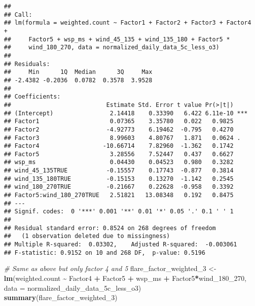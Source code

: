 \documentclass[
]{article}
\newenvironment{Shaded}{\begin{snugshade}}{\end{snugshade}}
\newcommand{\AttributeTok}[1]{\textcolor[rgb]{0.13,0.29,0.53}{#1}}
\newcommand{\CommentTok}[1]{\textcolor[rgb]{0.56,0.35,0.01}{\textit{#1}}}
\newcommand{\FunctionTok}[1]{\textcolor[rgb]{0.13,0.29,0.53}{\textbf{#1}}}
\newcommand{\NormalTok}[1]{#1}
\newcommand{\OtherTok}[1]{\textcolor[rgb]{0.56,0.35,0.01}{#1}}
\newcommand{\SpecialCharTok}[1]{\textcolor[rgb]{0.81,0.36,0.00}{\textbf{#1}}}
\begin{document}
\begin{verbatim}
## 
## Call:
## lm(formula = weighted.count ~ Factor1 + Factor2 + Factor3 + Factor4 + 
##     Factor5 + wsp_ms + wind_45_135 + wind_135_180 + Factor5 * 
##     wind_180_270, data = normalized_daily_data_5c_less_o3)
## 
## Residuals:
##     Min      1Q  Median      3Q     Max 
## -2.4382 -0.2036  0.0782  0.3578  3.9528 
## 
## Coefficients:
##                           Estimate Std. Error t value Pr(>|t|)    
## (Intercept)                2.14418    0.33390   6.422 6.11e-10 ***
## Factor1                    0.07365    3.35780   0.022   0.9825    
## Factor2                   -4.92773    6.19462  -0.795   0.4270    
## Factor3                    8.99603    4.80767   1.871   0.0624 .  
## Factor4                  -10.66714    7.82960  -1.362   0.1742    
## Factor5                    3.28556    7.52447   0.437   0.6627    
## wsp_ms                     0.04430    0.04523   0.980   0.3282    
## wind_45_135TRUE           -0.15557    0.17743  -0.877   0.3814    
## wind_135_180TRUE          -0.15153    0.13270  -1.142   0.2545    
## wind_180_270TRUE          -0.21667    0.22628  -0.958   0.3392    
## Factor5:wind_180_270TRUE   2.51821   13.08348   0.192   0.8475    
## ---
## Signif. codes:  0 '***' 0.001 '**' 0.01 '*' 0.05 '.' 0.1 ' ' 1
## 
## Residual standard error: 0.8524 on 268 degrees of freedom
##   (1 observation deleted due to missingness)
## Multiple R-squared:  0.03302,    Adjusted R-squared:  -0.003061 
## F-statistic: 0.9152 on 10 and 268 DF,  p-value: 0.5196
\end{verbatim}

\begin{Shaded}
\begin{Highlighting}[]
\CommentTok{\# Same as above but only factor 4 and 5}
\NormalTok{flare\_factor\_weighted\_3 }\OtherTok{\textless{}{-}} \FunctionTok{lm}\NormalTok{(weighted.count }\SpecialCharTok{\textasciitilde{}}\NormalTok{ Factor4 }\SpecialCharTok{+}\NormalTok{ Factor5 }\SpecialCharTok{+}\NormalTok{ wsp\_ms }\SpecialCharTok{+} 
\NormalTok{                                Factor5}\SpecialCharTok{*}\NormalTok{wind\_180\_270, }
                              \AttributeTok{data =}\NormalTok{ normalized\_daily\_data\_5c\_less\_o3)}
\FunctionTok{summary}\NormalTok{(flare\_factor\_weighted\_3)}
\end{Highlighting}
\end{Shaded}
\end{document}
